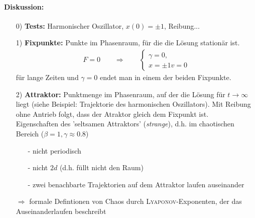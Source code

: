 \documentclass[12pt]{article}
\begin{document}
\paragraph{Diskussion:} 
\begin{enumerate}
\item[0)] \textbf{Tests:} Harmonischer Oszillator, $x(0) = \pm 1$, Reibung...
\item[1)] \textbf{Fixpunkte:} Punkte im Phasenraum, für die die Lösung stationär ist. 
\begin{align*}
F=0 \qquad \Rightarrow \qquad
\begin{cases}
\gamma =0, \\
 x = \pm 1
 v=0
\end{cases} 
\end{align*}
für lange Zeiten und $\gamma =0$ endet man in einem der beiden Fixpunkte.
\item[2)] \textbf{Attraktor:} Punktmenge im Phasenraum, auf der die Lösung für $t \to \infty$ liegt (siehe Beispiel: Trajektorie des harmonischen Oszillators). Mit Reibung ohne Antrieb folgt, dass der Atraktor gleich dem Fixpunkt ist. \\
Eigenschaften des 'seltsamen Attraktors' (\textit{strange}), d.h. im chaotischen Bereich ($\beta =1, \gamma \approx 0.8$)
\begin{itemize}
\item[-]nicht periodisch
\item[-]nicht $2d$ (d.h. füllt nicht den Raum)
\item[-]zwei benachbarte Trajektorien auf dem Attraktor laufen auseinander
\end{itemize}
$\Rightarrow$ formale Defintionen von Chaos durch \textsc{Lyaponov}-Exponenten, der das Auseinanderlaufen beschreibt
\end{enumerate}
\end{document}
